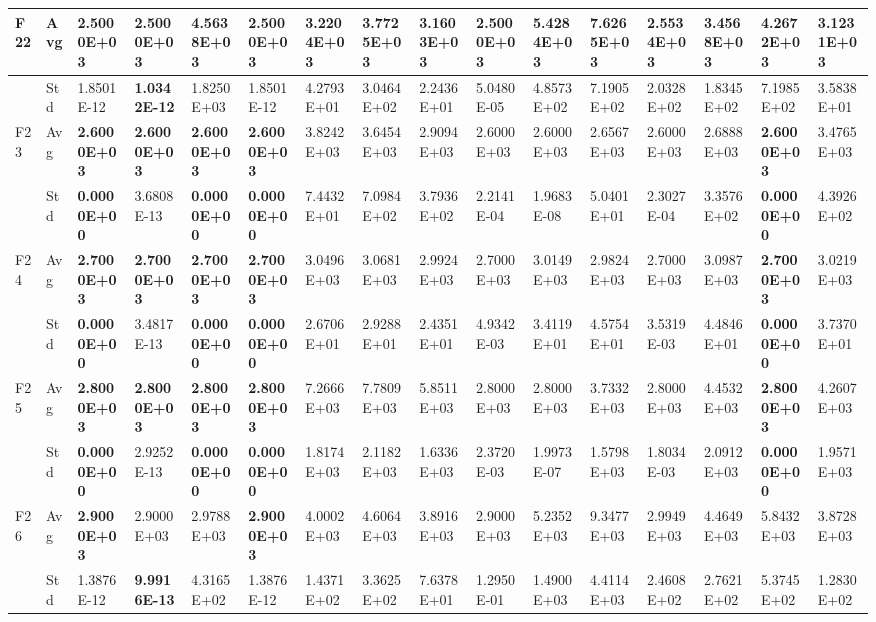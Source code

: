\documentclass{article} %
\begin{document}
\begin{tabular}{|p{0.3in}|p{0.3in}|p{0.3in}|p{0.3in}|p{0.3in}|p{0.3in}|p{0.3in}|p{0.3in}|p{0.3in}|p{0.3in}|p{0.3in}|p{0.3in}|p{0.3in}|p{0.3in}|p{0.3in}|p{0.5in}|}
F22 & Avg & \textbf{2.5000E+03} & 2.5000E+03 & 4.5638E+03 & \textbf{2.5000E+03} & 3.2204E+03 & 3.7725E+03 & 3.1603E+03 & 2.5000E+03 & 5.4284E+03 & 7.6265E+03 & 2.5534E+03 & 3.4568E+03 & 4.2672E+03 & 3.1231E+03 \\ \hline 
 & Std & 1.8501E-12 & \textbf{1.0342E-12} & 1.8250E+03 & 1.8501E-12 & 4.2793E+01 & 3.0464E+02 & 2.2436E+01 & 5.0480E-05 & 4.8573E+02 & 7.1905E+02 & 2.0328E+02 & 1.8345E+02 & 7.1985E+02 & 3.5838E+01 \\ \hline 
F23 & Avg & \textbf{2.6000E+03} & \textbf{2.6000E+03} & \textbf{2.6000E+03} & \textbf{2.6000E+03} & 3.8242E+03 & 3.6454E+03 & 2.9094E+03 & 2.6000E+03 & 2.6000E+03 & 2.6567E+03 & 2.6000E+03 & 2.6888E+03 & \textbf{2.6000E+03} & 3.4765E+03 \\ \hline 
 & Std & \textbf{0.0000E+00} & 3.6808E-13 & \textbf{0.0000E+00} & \textbf{0.0000E+00} & 7.4432E+01 & 7.0984E+02 & 3.7936E+02 & 2.2141E-04 & 1.9683E-08 & 5.0401E+01 & 2.3027E-04 & 3.3576E+02 & \textbf{0.0000E+00} & 4.3926E+02 \\ \hline 
F24 & Avg & \textbf{2.7000E+03} & \textbf{2.7000E+03} & \textbf{2.7000E+03} & \textbf{2.7000E+03} & 3.0496E+03 & 3.0681E+03 & 2.9924E+03 & 2.7000E+03 & 3.0149E+03 & 2.9824E+03 & 2.7000E+03 & 3.0987E+03 & \textbf{2.7000E+03} & 3.0219E+03 \\ \hline 
 & Std & \textbf{0.0000E+00} & 3.4817E-13 & \textbf{0.0000E+00} & \textbf{0.0000E+00} & 2.6706E+01 & 2.9288E+01 & 2.4351E+01 & 4.9342E-03 & 3.4119E+01 & 4.5754E+01 & 3.5319E-03 & 4.4846E+01 & \textbf{0.0000E+00} & 3.7370E+01 \\ \hline 
F25 & Avg & \textbf{2.8000E+03} & \textbf{2.8000E+03} & \textbf{2.8000E+03} & \textbf{2.8000E+03} & 7.2666E+03 & 7.7809E+03 & 5.8511E+03 & 2.8000E+03 & 2.8000E+03 & 3.7332E+03 & 2.8000E+03 & 4.4532E+03 & \textbf{2.8000E+03} & 4.2607E+03 \\ \hline 
 & Std & \textbf{0.0000E+00} & 2.9252E-13 & \textbf{0.0000E+00} & \textbf{0.0000E+00} & 1.8174E+03 & 2.1182E+03 & 1.6336E+03 & 2.3720E-03 & 1.9973E-07 & 1.5798E+03 & 1.8034E-03 & 2.0912E+03 & \textbf{0.0000E+00} & 1.9571E+03 \\ \hline 
F26 & Avg & \textbf{2.9000E+03} & 2.9000E+03 & 2.9788E+03 & \textbf{2.9000E+03} & 4.0002E+03 & 4.6064E+03 & 3.8916E+03 & 2.9000E+03 & 5.2352E+03 & 9.3477E+03 & 2.9949E+03 & 4.4649E+03 & 5.8432E+03 & 3.8728E+03 \\ \hline 
 & Std & 1.3876E-12 & \textbf{9.9916E-13} & 4.3165E+02 & 1.3876E-12 & 1.4371E+02 & 3.3625E+02 & 7.6378E+01 & 1.2950E-01 & 1.4900E+03 & 4.4114E+03 & 2.4608E+02 & 2.7621E+02 & 5.3745E+02 & 1.2830E+02 \\ \hline 

\end{tabular}
\end{document}
